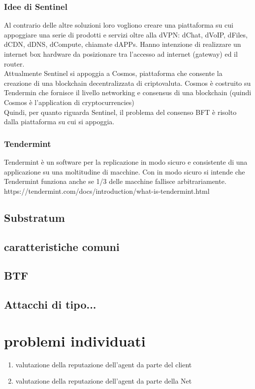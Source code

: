 \documentclass[]{article}
\begin{document}
	\subsubsection{Idee di Sentinel}	
	Al contrario delle altre soluzioni loro vogliono creare una piattaforma su cui appoggiare una serie di prodotti e servizi oltre alla dVPN: dChat, dVoIP, dFiles, dCDN, dDNS, dCompute, chiamate dAPPs.
	Hanno intenzione di realizzare un internet box hardware da posizionare tra l’accesso ad internet (gateway) ed il router.\\	
	Attualmente Sentinel si appoggia a Cosmos, piattaforma che consente la creazione di una blockchain decentralizzata di criptovaluta. Cosmos è costruito su Tendermin che fornisce il livello networking e consensus di una blockchain (quindi Cosmos è l’application di cryptocurrencies)\\	
	Quindi, per quanto riguarda Sentinel, il problema del consenso BFT è risolto dalla piattaforma su cui si appoggia.
	
	\subsubsection{Tendermint}
	Tendermint è un software per la replicazione in modo sicuro e consistente di una applicazione su una moltitudine di macchine. Con in modo sicuro si intende che Tendermint funziona anche se 1/3 delle macchine fallisce arbitrariamente.
	https://tendermint.com/docs/introduction/what-is-tendermint.html
	
	\subsection{Substratum}
	\subsection{caratteristiche comuni}
	\subsection{BTF}
	\subsection{Attacchi di tipo...}
		
	\section{problemi individuati}
	\begin{enumerate}
		\item valutazione della reputazione dell'agent da parte del client
		\item valutazione della reputazione dell'agent da parte della Net
	\end{enumerate}
	
\end{document}
